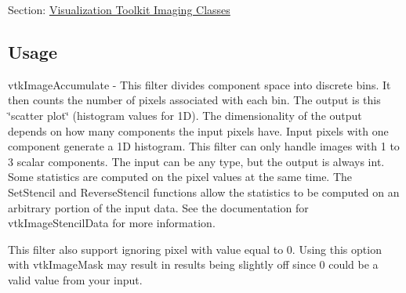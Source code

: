 Section\-: \hyperlink{sec_vtkimaging}{Visualization Toolkit Imaging Classes} \hypertarget{vtkwidgets_vtkxyplotwidget_Usage}{}\subsection{Usage}\label{vtkwidgets_vtkxyplotwidget_Usage}
vtk\-Image\-Accumulate -\/ This filter divides component space into discrete bins. It then counts the number of pixels associated with each bin. The output is this \char`\"{}scatter plot\char`\"{} (histogram values for 1\-D). The dimensionality of the output depends on how many components the input pixels have. Input pixels with one component generate a 1\-D histogram. This filter can only handle images with 1 to 3 scalar components. The input can be any type, but the output is always int. Some statistics are computed on the pixel values at the same time. The Set\-Stencil and Reverse\-Stencil functions allow the statistics to be computed on an arbitrary portion of the input data. See the documentation for vtk\-Image\-Stencil\-Data for more information.

This filter also support ignoring pixel with value equal to 0. Using this option with vtk\-Image\-Mask may result in results being slightly off since 0 could be a valid value from your input.

